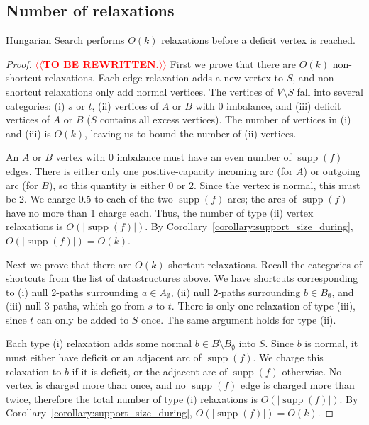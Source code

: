 \documentclass[a4paper,UKenglish]{socg-lipics-v2018}
\makeatletter
\def\note#1{\textcolor{red}{{#1}}}
\def\supp{\operatorname{supp}}
\theoremstyle{plain}
\numberwithin{figure}{section}
\def\n@te#1{\textsf{\boldmath \textbf{$\langle\!\langle$#1$\rangle\!\rangle$}}\leavevmode}
\def\note#1{\textcolor{red}{\n@te{#1}}}
\makeatother
\begin{document}
\subsection{Number of relaxations}

\begin{lemmarep}
\label{lemma:goldberg_hs_length}
Hungarian Search performs $O(k)$ relaxations before a deficit vertex is reached.
\end{lemmarep}

\begin{proof}
\note{TO BE REWRITTEN.}
First we prove that there are $O(k)$ non-shortcut relaxations.
%
Each edge relaxation adds a new vertex to $S$, and non-shortcut relaxations
only add normal vertices.
The vertices of $V \setminus S$ fall into several categories:
(i) $s$ or $t$, (ii) vertices of $A$ or $B$ with 0 imbalance, and (iii)
deficit vertices of $A$ or $B$ ($S$ contains all excess vertices).
The number of vertices in (i) and (iii) is $O(k)$, leaving us to bound the
number of (ii) vertices.

An $A$ or $B$ vertex with 0 imbalance must have an even number of $\supp(f)$
edges.
There is either only one positive-capacity incoming arc (for $A$) or outgoing
arc (for $B$), so this quantity is either 0 or 2.
Since the vertex is normal, this must be 2.
We charge 0.5 to each of the two $\supp(f)$ arcs; the arcs of $\supp(f)$
have no more than 1 charge each.
Thus, the number of type (ii) vertex relaxations is $O(|\supp(f)|)$.
By Corollary~\ref{corollary:support_size_during}, $O(|\supp(f)|) = O(k)$.

Next we prove that there are $O(k)$ shortcut relaxations.
%
Recall the categories of shortcuts from the list of datastructures above.
We have shortcuts corresponding to (i) null 2-paths surrounding
$a \in A_\emptyset$, (ii) null 2-paths surrounding $b \in B_\emptyset$, and
(iii) null 3-paths, which go from $s$ to $t$.
%
There is only one relaxation of type (iii), since $t$ can only be added to $S$
once.
The same argument holds for type (ii).

Each type (i) relaxation adds some normal $b \in B \setminus B_\emptyset$
into $S$.
Since $b$ is normal, it must either have deficit or an adjacent arc of
$\supp(f)$.
We charge this relaxation to $b$ if it is deficit, or the adjacent arc of
$\supp(f)$ otherwise.
No vertex is charged more than once, and no $\supp(f)$ edge is charged more
than twice, therefore the total number of type (i) relaxations is
$O(|\supp(f)|)$.
By Corollary~\ref{corollary:support_size_during}, $O(|\supp(f)|) = O(k)$.
\end{proof}
\end{document}
